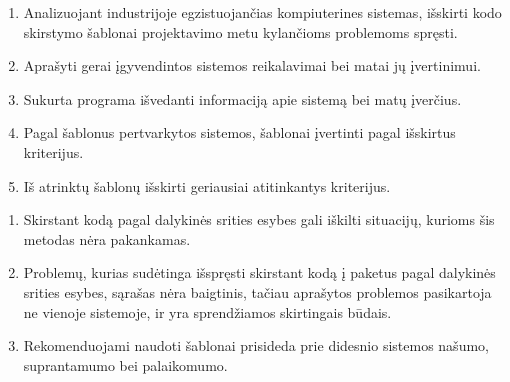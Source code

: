 \documentclass[
]{VUMIFPSbakalaurinis}
\begin{document}
\tableofcontents






%


\begin{enumerate}
    \item Analizuojant industrijoje egzistuojančias kompiuterines sistemas, išskirti kodo skirstymo šablonai projektavimo metu kylančioms problemoms spręsti.
    \item Aprašyti gerai įgyvendintos sistemos reikalavimai bei matai jų įvertinimui.
    \item Sukurta programa išvedanti informaciją apie sistemą bei matų įverčius.
    \item Pagal šablonus pertvarkytos sistemos, šablonai įvertinti pagal išskirtus kriterijus.
    \item Iš atrinktų šablonų išskirti geriausiai atitinkantys kriterijus.
\end{enumerate}

\begin{enumerate}[labelindent=0pt]
    \item Skirstant kodą pagal dalykinės srities esybes gali iškilti situacijų, kurioms šis metodas nėra pakankamas.
    \item Problemų, kurias sudėtinga išspręsti skirstant kodą į paketus pagal dalykinės srities esybes, sąrašas nėra baigtinis, tačiau
    aprašytos problemos pasikartoja ne vienoje sistemoje, ir yra sprendžiamos skirtingais būdais.
    \item Rekomenduojami naudoti šablonai prisideda prie didesnio sistemos našumo, suprantamumo bei palaikomumo.
\end{enumerate}

\printbibliography[heading=bibintoc]  %

%
\end{document}
